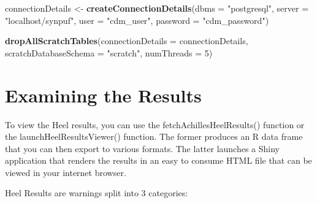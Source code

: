 \documentclass[]{article}
\newenvironment{Shaded}{\begin{snugshade}}{\end{snugshade}}
\newcommand{\KeywordTok}[1]{\textcolor[rgb]{0.13,0.29,0.53}{\textbf{#1}}}
\newcommand{\DataTypeTok}[1]{\textcolor[rgb]{0.13,0.29,0.53}{#1}}
\newcommand{\DecValTok}[1]{\textcolor[rgb]{0.00,0.00,0.81}{#1}}
\newcommand{\StringTok}[1]{\textcolor[rgb]{0.31,0.60,0.02}{#1}}
\newcommand{\NormalTok}[1]{#1}
\begin{document}
\begin{Shaded}
\begin{Highlighting}[]
\NormalTok{connectionDetails <-}\StringTok{ }\KeywordTok{createConnectionDetails}\NormalTok{(}\DataTypeTok{dbms =} \StringTok{"postgresql"}\NormalTok{, }
                                             \DataTypeTok{server =} \StringTok{"localhost/synpuf"}\NormalTok{, }
                                             \DataTypeTok{user =} \StringTok{"cdm_user"}\NormalTok{, }
                                             \DataTypeTok{password =} \StringTok{"cdm_password"}\NormalTok{)}

\KeywordTok{dropAllScratchTables}\NormalTok{(}\DataTypeTok{connectionDetails =}\NormalTok{ connectionDetails, }
                     \DataTypeTok{scratchDatabaseSchema =} \StringTok{"scratch"}\NormalTok{, }\DataTypeTok{numThreads =} \DecValTok{5}\NormalTok{)}
\end{Highlighting}
\end{Shaded}

\section{Examining the Results}\label{examining-the-results}

To view the Heel results, you can use the fetchAchillesHeelResults()
function or the launchHeelResultsViewer() function. The former produces
an R data frame that you can then export to various formats. The latter
launches a Shiny application that renders the results in an easy to
consume HTML file that can be viewed in your internet browser.

Heel Results are warnings split into 3 categories:
\end{document}
